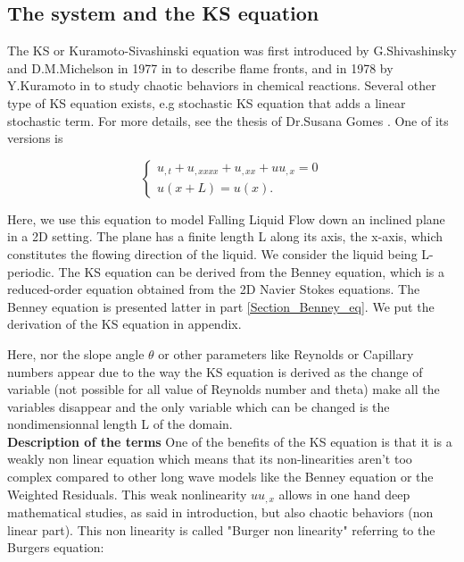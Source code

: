 \documentclass[12pt]{article}
\begin{document}
\subsection{The system and the KS equation}

The KS or Kuramoto-Sivashinski equation was first introduced by G.Shivashinsky and D.M.Michelson in 1977 in \cite{Shiv_Michelson_KS_eq} to describe flame fronts, and in 1978 by Y.Kuramoto in \cite{Kuramoto_KS_eq} to study chaotic behaviors in chemical reactions. Several other type of KS equation exists, e.g stochastic KS equation that adds  a linear stochastic term. For more details, see the thesis of Dr.Susana Gomes \cite{Susana_thesis}. One of its versions is

\begin{equation}\label{KS_eq_L}
\left\{
\begin{aligned}
    u_{,t} + u_{,xxxx}  + u_{,xx} + uu_{,x} = 0 \\
    u(x+L)=u(x). 
\end{aligned}
\right.
\end{equation}



Here, we use this equation to model Falling Liquid Flow down an inclined plane in a 2D setting. The plane has a finite length L along its axis, the x-axis, which constitutes the flowing direction of the liquid. We consider the liquid being L-periodic. 
The KS equation can be derived from the Benney equation, which is a reduced-order equation obtained from the 2D Navier Stokes equations. The Benney equation is presented latter in part \ref{Section_Benney_eq}. We put the derivation of the KS equation in appendix. 

Here, nor the slope angle $\theta$ or other parameters like Reynolds or Capillary numbers appear due to the way the KS equation is derived as the change of variable (not possible for all value of Reynolds number and theta) make all the variables disappear and the only variable which can be changed is the nondimensionnal length L of the domain. 
\\

\textbf{Description of the terms}
One of the benefits of the KS equation is that it is a weakly non linear equation which means that its non-linearities aren't too complex compared to other long wave models like the Benney equation or the Weighted Residuals. This weak nonlinearity $uu_{,x}$ allows in one hand deep mathematical studies, as said in introduction, but also chaotic behaviors (non linear part). This non linearity is called "Burger non linearity" referring to the Burgers equation:
\end{document}
